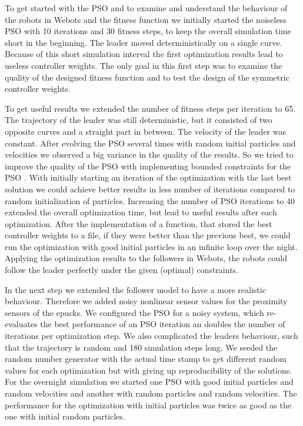 \documentclass[a4, 10 pt, conference]{ieeeconf}  %
\begin{document}
To get started with the PSO and to examine and understand the behaviour of the robots in Webots and the fitness function we initially started the  noiseless PSO with 10 iterations and 30 fitness steps, to keep the overall simulation time short in the beginning. The leader moved deterministically on a single curve.  Because of this short simulation interval the first optimization results lead to useless controller weights. The only goal in this first step was to examine the quality of the designed fitness function and to test the design of the symmetric controller weights.

To get useful results we extended the number of fitness steps per iteration to 65. The trajectory of the leader was still deterministic, but it consisted of two opposite curves and a straight part in between. The velocity of the leader was constant. After evolving the PSO several times with random initial particles and velocities we observed a big variance in the quality of the results. So we tried to improve the quality of the PSO with implementing bounded constraints for the PSO \cite{c1}. With initially starting an iteration of the optimization with the last best solution we could achieve better results in less number of iterations compared to random initialization of particles. Increasing the number of PSO iterations to 40 extended the overall optimization time, but lead to useful results after each optimization. After the implementation of a function, that stored the best controller weights to a file, if they were better than the previous best, we could run the optimization with good initial particles in an infinite loop over the night. Applying the optimization results to the followers in Webots, the robots could follow the leader perfectly under the given (optimal) constraints.

In the next step we extended the follower model to have a more realistic behaviour. Therefore we added noisy nonlinear sensor values for the proximity sensors of the epucks. We configured the PSO for a noisy system, which re-evaluates the best performance of an PSO iteration an doubles the number of iterations per optimization step. We also complicated the leaders behaviour, such that the trajectory is random and 180 simulation steps long. We seeded the random number generator with the actual time stamp to get different random values for each optimization but with giving up reproducibility of the solutions. For the overnight simulation we started one PSO with good initial particles and random velocities and another with random particles and random velocities. The performance for the optimization with initial particles was twice as good as the one with initial random particles.
\end{document}
